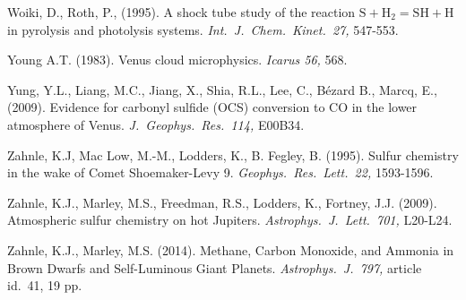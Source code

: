 \documentclass[preprint]{aastex6}
\newcounter{reaction}
\begin{document}
\begin{thebibliography}{00}
Woiki, D., Roth, P., (1995).
A shock tube study of the reaction $\mathrm{S} + \mathrm{H}_2 = \mathrm{SH} + \mathrm{H}$ in pyrolysis and photolysis systems.
{\em Int.\ J.\ Chem.\ Kinet.\ 27,}  547-553.


Young A.T. (1983).
Venus cloud microphysics.
 {\em Icarus 56,} 568.

Yung, Y.L., Liang, M.C., Jiang, X., Shia, R.L., Lee, C., B{\'e}zard B.,  Marcq, E., (2009).
Evidence for carbonyl sulfide (OCS) conversion to CO in the lower atmosphere of Venus.
{\em J.\ Geophys.\ Res.\ 114,} E00B34. %

Zahnle, K.J, Mac Low, M.-M., Lodders, K., B. Fegley, B. (1995). 
Sulfur chemistry in the wake of Comet Shoemaker-Levy 9.
{\em Geophys.\ Res.\ Lett.\ 22,} 1593-1596.

Zahnle, K.J., Marley, M.S., Freedman, R.S., Lodders, K., Fortney, J.J. (2009).
Atmospheric sulfur chemistry on hot Jupiters.  {\em Astrophys.\ J.\ Lett.\ 701,} L20-L24.

Zahnle, K.J., Marley, M.S. (2014).
Methane, Carbon Monoxide, and Ammonia in Brown Dwarfs and Self-Luminous Giant Planets.
{\em Astrophys.\ J.\ 797,} article id.\ 41, 19 pp.

 \end{thebibliography}

\small


\clearpage

\newpage
\end{document}
